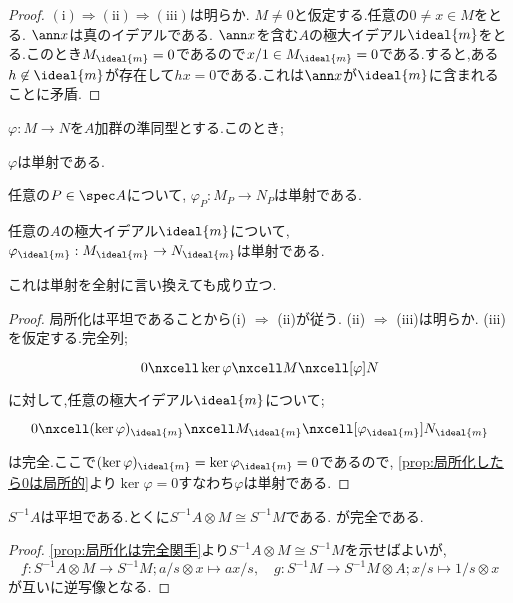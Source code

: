 \begin{proof}
	$(\text{i})\Longrightarrow(\text{ii})\Longrightarrow(\text{iii})$は明らか. $M\neq0$と仮定する.任意の$0\neq x\in M$をとる. $\ann x$は真のイデアルである. $\ann x$を含む$A$の極大イデアル$\ideal{m}$をとる.このとき$M_{\ideal{m}}=0$であるので$x/1\in M_{\ideal{m}}=0$である.すると,ある$h\not\in\ideal{m}$が存在して$hx=0$である.これは$\ann x$が$\ideal{m}$に含まれることに矛盾.
\end{proof}

\begin{prop}\label{prop:局所的性質}
	$\varphi:M\to N$を$A$加群の準同型とする.このとき;
	\begin{sakura}
		\item $\varphi$は単射である.
		\item 任意の$P\in\spec A$について, $\varphi_P:M_P\to N_P$は単射である.
		\item 任意の$A$の極大イデアル$\ideal{m}$について, 
		$\varphi_{\ideal{m}}:M_{\ideal{m}}\to N_{\ideal{m}}$は単射である.
	\end{sakura}
	これは単射を全射に言い換えても成り立つ.
\end{prop}

\begin{proof}
	局所化は平坦であることから(i) $\Longrightarrow$ (ii)が従う. (ii) $\Longrightarrow$ (iii)は明らか. (iii)を仮定する.完全列;
	\[\begin{tikzcd}
	0\nxcell\ker\varphi\nxcell M\nxcell[\varphi]N
	\end{tikzcd}\]
	に対して,任意の極大イデアル$\ideal{m}$について;
	\[\begin{tikzcd}
	0\nxcell(\ker\varphi)_{\ideal{m}}\nxcell M_{\ideal{m}}\nxcell[\varphi_{\ideal{m}}]N_{\ideal{m}}
	\end{tikzcd}\]
	は完全.ここで$(\ker\varphi)_{\ideal{m}}=\ker\varphi_{\ideal{m}}=0$であるので, \ref{prop:局所化したら0は局所的}より$\ker\varphi=0$すなわち$\varphi$は単射である.
\end{proof}

\begin{prop}\label{prop:局所化は平坦}
	$S^{-1}A$は平坦である.とくに$S^{-1}A\otimes M\cong S^{-1}M$である.
	が完全である.
\end{prop}

\begin{proof}
	\ref{prop:局所化は完全関手}より$S^{-1}A\otimes M\cong S^{-1}M$を示せばよいが,	
	\[f:S^{-1}A\otimes M\to S^{-1}M;a/s\otimes x\mapsto ax/s,\quad g:S^{-1}M\to S^{-1}M\otimes A;x/s\mapsto 1/s\otimes x\]
	が互いに逆写像となる.
\end{proof}
